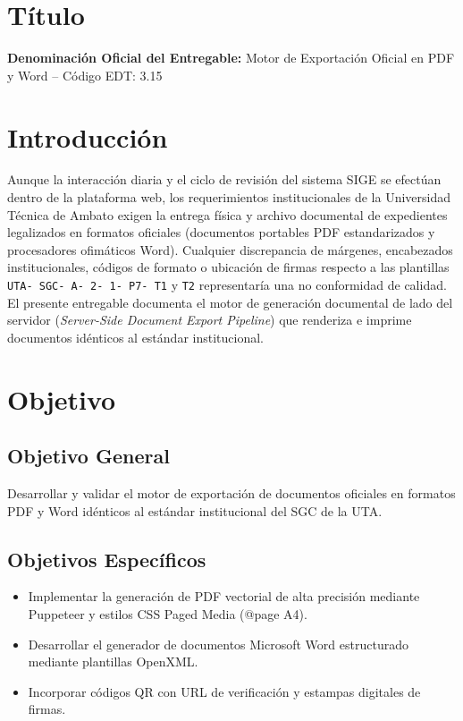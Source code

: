 \documentclass[12pt,a4paper]{article}
\begin{document}
\section{Título}
\textbf{Denominación Oficial del Entregable:} Motor de Exportación Oficial en PDF y Word -- Código EDT: 3.15

\section{Introducción}
Aunque la interacción diaria y el ciclo de revisión del sistema SIGE se efectúan dentro de la plataforma web, los requerimientos institucionales de la Universidad Técnica de Ambato exigen la entrega física y archivo documental de expedientes legalizados en formatos oficiales (documentos portables PDF estandarizados y procesadores ofimáticos Word). Cualquier discrepancia de márgenes, encabezados institucionales, códigos de formato o ubicación de firmas respecto a las plantillas \texttt{UTA- SGC- A- 2- 1- P7- T1} y \texttt{T2} representaría una no conformidad de calidad. El presente entregable documenta el motor de generación documental de lado del servidor (\textit{Server-Side Document Export Pipeline}) que renderiza e imprime documentos idénticos al estándar institucional.

\section{Objetivo}
\subsection{Objetivo General}
Desarrollar y validar el motor de exportación de documentos oficiales en formatos PDF y Word idénticos al estándar institucional del SGC de la UTA.
\subsection{Objetivos Específicos}
\begin{itemize}[leftmargin=1.5em, itemsep=2pt]
    \item Implementar la generación de PDF vectorial de alta precisión mediante Puppeteer y estilos CSS Paged Media (@page A4).
    \item Desarrollar el generador de documentos Microsoft Word estructurado mediante plantillas OpenXML.
    \item Incorporar códigos QR con URL de verificación y estampas digitales de firmas.
\end{itemize}
\end{document}
